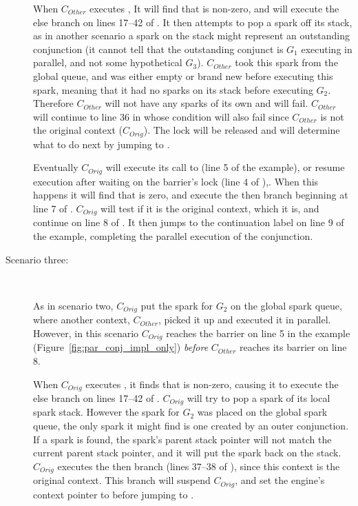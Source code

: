 \begin{description}
    When $C_{Other}$ executes \joinandcontinue,
    It will find that  is non-zero,
    and will execute the else branch on lines 17--42 of \joinandcontinue.
    It then attempts to pop a spark off its stack,
    as in another scenario a spark on the stack might represent an
    outstanding conjunction
    (it cannot tell that the outstanding conjunct is $G_1$ executing in
    parallel, and not some hypothetical $G_3$).
    $C_{Other}$ took this spark from the global queue,
    and was either empty or brand new before executing this spark,
    meaning that it had no sparks on its stack before executing $G_2$.
    Therefore $C_{Other}$ will not have any sparks of its own and
     will fail.
    $C_{Other}$ will continue to line 36 in \joinandcontinue
    whose condition will also fail since $C_{Other}$
    is not the original context ($C_{Orig}$).
    The lock will be released and \joinandcontinue will determine what to do
    next by jumping to \idle.

    Eventually $C_{Orig}$ will execute its call to \joinandcontinue
    (line 5 of the example),
    or resume execution after waiting on the barrier's lock (line 4 of
    \joinandcontinue),.
    When this happens it will find that 
    is zero,
    and execute the then branch beginning at line 7 of \joinandcontinue.
    $C_{Orig}$ will test if it is the original context,
    which it is,
    and continue on line 8 of \joinandcontinue.
    It then jumps to the continuation label on line 9 of the example,
    completing the parallel execution of the conjunction.

    \item[Scenario three:]~

    As in scenario two, $C_{Orig}$ put the spark for $G_2$ on the global spark
    queue,
    where another context, $C_{Other}$, picked it up and executed it
    in parallel.
    However,
    in this scenario
    $C_{Orig}$ reaches the barrier on line 5 in the example
    (Figure~\ref{fig:par_conj_impl_only})
    \emph{before}
    $C_{Other}$ reaches its barrier on line 8.

    When $C_{Orig}$ executes \joinandcontinue,
    it finds that  is non-zero,
    causing it to execute the else branch on lines 17--42 of \joinandcontinue.
    $C_{Orig}$ will try to pop a spark of its local spark stack.
    However the spark for $G_2$ was placed on the global
    spark queue,
    the only spark it might find is one created by an outer conjunction.
    If a spark is found, the spark's parent stack pointer will not match the
    current parent stack pointer,
    and it will put the spark back on the stack.
    $C_{Orig}$ executes the then branch (lines 37--38 of \joinandcontinue),
    since this context is the original context.
    This branch will suspend $C_{Orig}$,
    and set the engine's context pointer to \NULL
    before jumping to \idle.


\end{description}
